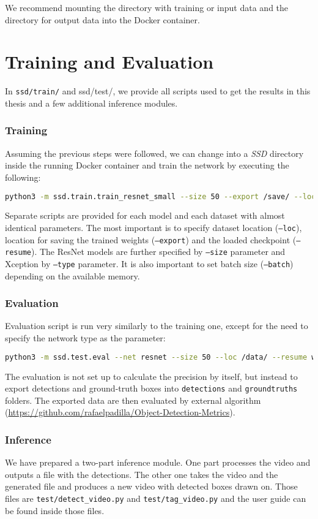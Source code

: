 \noindent We recommend mounting the directory with training or input data and the directory for output data into the Docker container.


\section{Training and Evaluation}

In {\tt ssd/train/} and {ssd/test/}, we provide all scripts used to get the results in this thesis and a few additional inference modules. 

\subsubsection{Training}
Assuming the previous steps were followed, we can change into a \textit{SSD} directory inside the running Docker container and train the network by executing the following:

\begin{lstlisting}[breaklines, frame=single, language=Bash, basicstyle=\ttfamily]
  python3 -m ssd.train.train_resnet_small --size 50 --export /save/ --loc /data/ --resume imgnet
\end{lstlisting}

Separate scripts are provided for each model and each dataset with almost identical parameters. The most important is to specify dataset location ({\tt --loc}), location for saving the trained weights ({\tt --export}) and the loaded checkpoint ({\tt --resume}). The ResNet models are further specified by {\tt --size} parameter and Xception by {\tt --type} parameter. It is also important to set batch size ({\tt --batch}) depending on the available memory. 

\subsubsection{Evaluation}
Evaluation script is run very similarly to the training one, except for the need to specify the network type as the parameter:
\begin{lstlisting}[breaklines, frame=single, language=Bash, basicstyle=\ttfamily]
  python3 -m ssd.test.eval --net resnet --size 50 --loc /data/ --resume weights --batch 16
\end{lstlisting}
The evaluation is not set up to calculate the precision by itself, but instead to export detections and ground-truth boxes into {\tt detections} and {\tt groundtruths} folders. The exported data are then evaluated by external algorithm (\url{https://github.com/rafaelpadilla/Object-Detection-Metrics}).

\subsubsection{Inference}
We have prepared a two-part inference module. One part processes the video and outputs a file with the detections. The other one takes the video and the generated file and produces a new video with detected boxes drawn on. Those files are {\tt test/detect\_video.py} and {\tt test/tag\_video.py} and the user guide can be found inside those files.
